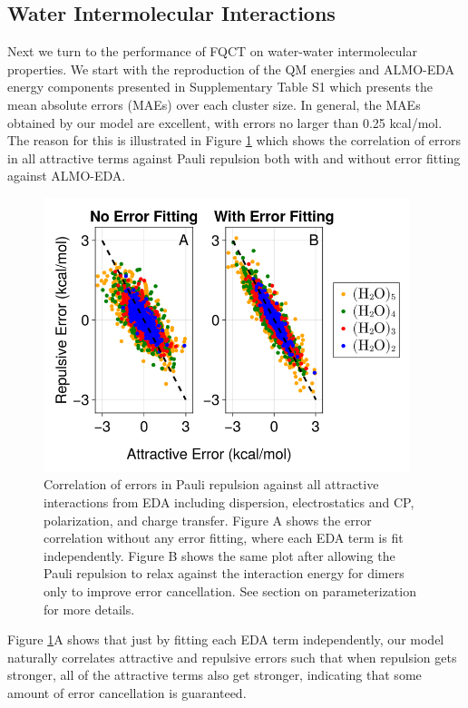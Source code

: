 \documentclass[journal=jctcce,manuscript=article]{achemso}
\begin{document}
\subsection*{Water Intermolecular Interactions}
Next we turn to the performance of FQCT on water-water intermolecular properties. We start with the reproduction of the QM energies and ALMO-EDA energy components presented in Supplementary Table S1 which presents the mean absolute errors (MAEs) over each cluster size. In general, the MAEs obtained by our model are excellent, with errors no larger than 0.25 kcal/mol. The reason for this is illustrated in Figure \ref{fig:error_correlation} which shows the correlation of errors in all attractive terms against Pauli repulsion both with and without error fitting against ALMO-EDA.
\begin{figure}[h]
  \includegraphics*[width=0.95\textwidth]{figures/error_correlation.png}
  \caption{Correlation of errors in Pauli repulsion against all attractive interactions from EDA including dispersion, electrostatics and CP, polarization, and charge transfer. Figure A shows the error correlation without any error fitting, where each EDA term is fit independently. Figure B shows
  the same plot after allowing the Pauli repulsion to relax against the interaction
  energy for dimers only to improve error cancellation. See section on parameterization for more details.}
  \label{fig:error_correlation}
\end{figure}
Figure \ref{fig:error_correlation}A shows that just by fitting each EDA term independently, our model naturally correlates attractive and repulsive errors such that when repulsion gets stronger, all of the attractive terms also get stronger, indicating that some amount of error cancellation is guaranteed. %
\end{document}
